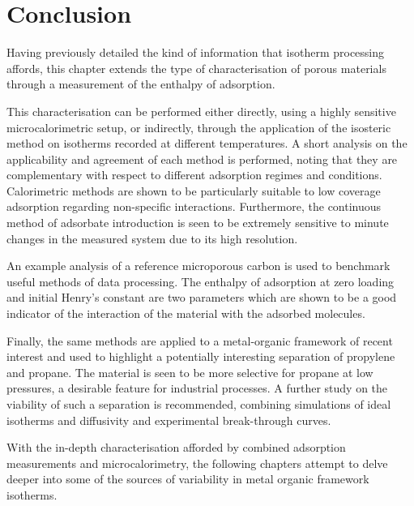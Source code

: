 
\section{Conclusion}

Having previously detailed the kind of information that isotherm
processing affords, this chapter extends the type of characterisation
of porous materials through a measurement of the enthalpy of 
adsorption.

This characterisation can be performed either 
directly, using a highly sensitive microcalorimetric setup, or 
indirectly, through the application of the isosteric method on
isotherms recorded at different temperatures. A short analysis
on the applicability and agreement of each method is performed,
noting that they are complementary with respect to different
adsorption regimes and conditions. Calorimetric methods
are shown to be particularly suitable to low coverage adsorption 
regarding non-specific interactions. Furthermore, the continuous method
of adsorbate introduction is seen to be extremely sensitive
to minute changes in the measured system due to its high resolution.

An example analysis of a reference microporous carbon is
used to benchmark useful methods of data processing. The 
enthalpy of adsorption at zero loading and initial Henry's 
constant are two parameters which are shown to be a good 
indicator of the interaction of the material with the 
adsorbed molecules.

Finally, the same methods are applied to a metal-organic
framework of recent interest and used to highlight 
a potentially interesting separation of propylene and 
propane. The material is seen to be more selective for 
propane at low pressures, a desirable feature for 
industrial processes. A further study on the viability 
of such a separation is recommended, combining simulations of 
ideal isotherms and diffusivity and experimental break-through
curves.

With the in-depth characterisation afforded by combined adsorption
measurements and microcalorimetry, the following chapters attempt
to delve deeper into some of the sources of variability in metal
organic framework isotherms.

\FloatBarrier{}
\pagebreak